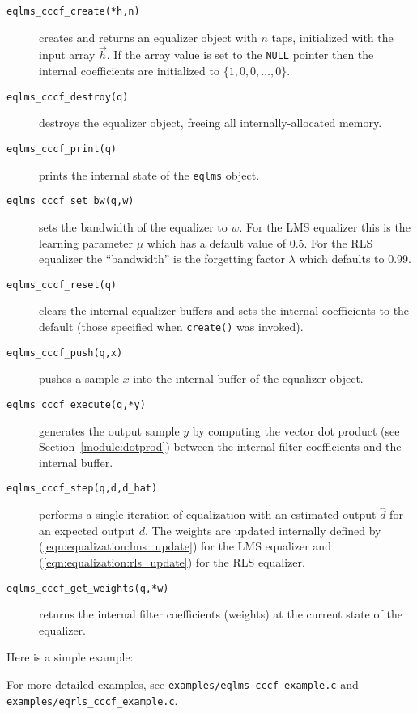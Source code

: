 \begin{description}
\item[{\tt eqlms\_cccf\_create(*h,n)}]
    creates and returns an equalizer object with $n$ taps,
    initialized with the input array $\vec{h}$.
    If the array value is set to the {\tt NULL} pointer then the
    internal coefficients are initialized to
    $\{1,0,0,\ldots,0\}$.
\item[{\tt eqlms\_cccf\_destroy(q)}]
    destroys the equalizer object, freeing all internally-allocated
    memory.
\item[{\tt eqlms\_cccf\_print(q)}]
    prints the internal state of the {\tt eqlms} object.
\item[{\tt eqlms\_cccf\_set\_bw(q,w)}]
    sets the bandwidth of the equalizer to $w$.
    For the LMS equalizer this is the learning parameter $\mu$ which has
    a default value of 0.5.
    For the RLS equalizer the ``bandwidth'' is the forgetting factor
    $\lambda$ which defaults to 0.99.
\item[{\tt eqlms\_cccf\_reset(q)}]
    clears the internal equalizer buffers and sets the internal
    coefficients to the default
    (those specified when {\tt create()} was invoked).
\item[{\tt eqlms\_cccf\_push(q,x)}]
    pushes a sample $x$ into the internal buffer of the equalizer
    object.
\item[{\tt eqlms\_cccf\_execute(q,*y)}]
    generates the output sample $y$ by computing the vector dot product
    (see Section~\ref{module:dotprod})
    between the internal filter coefficients and the internal buffer.
\item[{\tt eqlms\_cccf\_step(q,d,d\_hat)}]
    performs a single iteration of equalization with an estimated output
    $\hat{d}$ for an expected output $d$.
    The weights are updated internally defined by
    (\ref{eqn:equalization:lms_update}) for the LMS equalizer and
    (\ref{eqn:equalization:rls_update}) for the RLS equalizer.
\item[{\tt eqlms\_cccf\_get\_weights(q,*w)}]
    returns the internal filter coefficients (weights) at the current
    state of the equalizer.
\end{description}
%
Here is a simple example:
%

%
For more detailed examples, see
{\tt examples/eqlms\_cccf\_example.c} and
{\tt examples/eqrls\_cccf\_example.c}.

